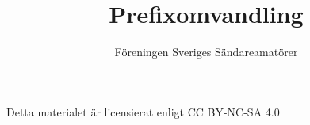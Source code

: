 \documentclass[a4paper]{article}
\begin{document}
\title{Prefixomvandling}
\author{Föreningen Sveriges Sändareamatörer}

\maketitle

Detta materialet är licensierat enligt CC BY-NC-SA 4.0


\end{document}
